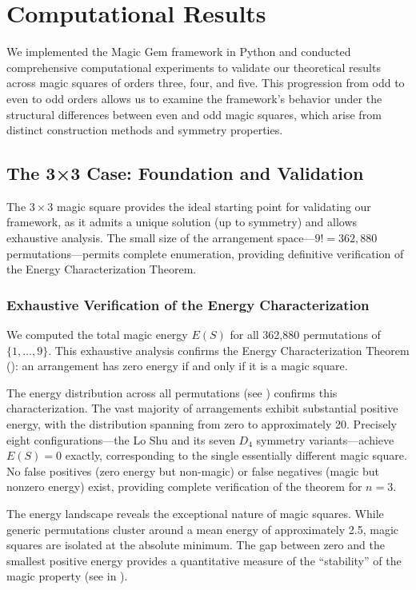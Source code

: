 \section{Computational Results}
\label{sec:results}

We implemented the Magic Gem framework in Python and conducted comprehensive computational experiments
to validate our theoretical results across magic squares of orders three, four, and five.
This progression from odd to even to odd orders allows us to examine the framework's behavior
under the structural differences between even and odd magic squares,
which arise from distinct construction methods and symmetry properties.

\subsection{The 3×3 Case: Foundation and Validation}

The $3 \times 3$ magic square provides the ideal starting point for validating our framework,
as it admits a unique solution (up to symmetry) and allows exhaustive analysis.
The small size of the arrangement space---$9! = 362{,}880$ permutations---permits 
complete enumeration, providing definitive verification of the Energy Characterization Theorem.

\subsubsection{Exhaustive Verification of the Energy Characterization}

We computed the total magic energy $E(S)$ for all 362,880 permutations of $\{1, \ldots, 9\}$.
This exhaustive analysis confirms the Energy Characterization Theorem ():
an arrangement has zero energy if and only if it is a magic square.

The energy distribution across all permutations (see ) confirms this characterization.
The vast majority of arrangements exhibit substantial positive energy,
with the distribution spanning from zero to approximately 20.
Precisely eight configurations---the Lo Shu and its seven $D_4$ symmetry variants---achieve 
$E(S) = 0$ exactly, corresponding to the single essentially different magic square.
No false positives (zero energy but non-magic) or false negatives (magic but nonzero energy) exist,
providing complete verification of the theorem for $n = 3$.

The energy landscape reveals the exceptional nature of magic squares.
While generic permutations cluster around a mean energy of approximately 2.5,
magic squares are isolated at the absolute minimum.
The gap between zero and the smallest positive energy provides a quantitative measure 
of the ``stability'' of the magic property
(see  in ).

